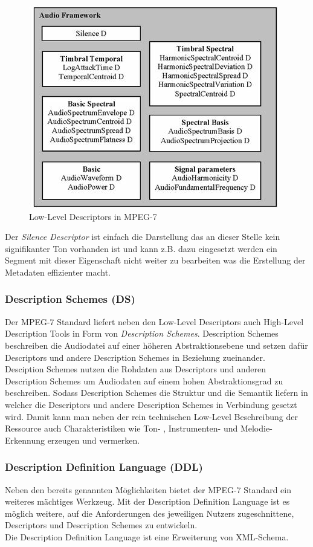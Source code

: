 \begin{figure}[h]
\includegraphics [scale=0.65]{image061.jpg}
\caption {Low-Level Descriptors in MPEG-7}
\end{figure}

Der \emph{Silence Descriptor} ist einfach die Darstellung das an dieser Stelle kein signifikanter Ton vorhanden ist und kann z.B. dazu eingesetzt werden ein Segment mit dieser Eigenschaft nicht weiter zu bearbeiten was die Erstellung der Metadaten effizienter macht.\\

	\subsubsection{Description Schemes (DS)}
		Der MPEG-7 Standard liefert neben den Low-Level Descriptors auch High-Level Description Tools in Form von \emph{Description Schemes}. Description Schemes beschreiben die Audiodatei auf einer höheren Abstraktionsebene und setzen dafür Descriptors und andere Description Schemes in Beziehung zueinander. \\Desciption Schemes nutzen die Rohdaten aus Descriptors und anderen Description Schemes um Audiodaten auf einem hohen Abstraktionsgrad zu beschreiben. Sodass Description Schemes die Struktur und die Semantik liefern in welcher die Descriptors und andere Description Schemes in Verbindung gesetzt wird. Damit kann man neben der rein technischen Low-Level Beschreibung der Ressource auch Charakteristiken wie Ton- , Instrumenten- und Melodie-Erkennung erzeugen und vermerken. \\
		
	\subsubsection{Description Definition Language (DDL)}
Neben den bereits genannten Möglichkeiten bietet der MPEG-7 Standard ein weiteres mächtiges Werkzeug. Mit der Description Definition Language ist es möglich weitere, auf die Anforderungen des jeweiligen Nutzers zugeschnittene, Descriptors und Description Schemes zu entwickeln.\\ Die Description Definition Language ist eine Erweiterung von XML-Schema.

